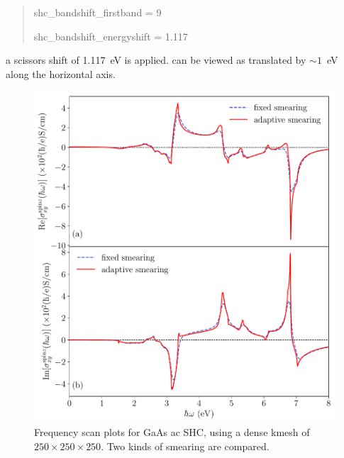 \begin{itemize}
{\begin{quote}
		shc\_bandshift\_firstband = 9
		
		shc\_bandshift\_energyshift = 1.117
\end{quote} }
a scissors shift of 1.117~eV is applied. 
 can be viewed as  translated by 
$\sim1$~eV along the horizontal axis. 
\begin{figure}[!htb]
\centering
\includegraphics[width=0.8\columnwidth]{figure/example30/gaas_freqscan.pdf}
\caption{Frequency scan plots for GaAs ac SHC, using 
	a dense kmesh of $250\times250\times250$. 
Two kinds of smearing are compared.}
\label{fig30.2}
\end{figure}
\end{itemize}